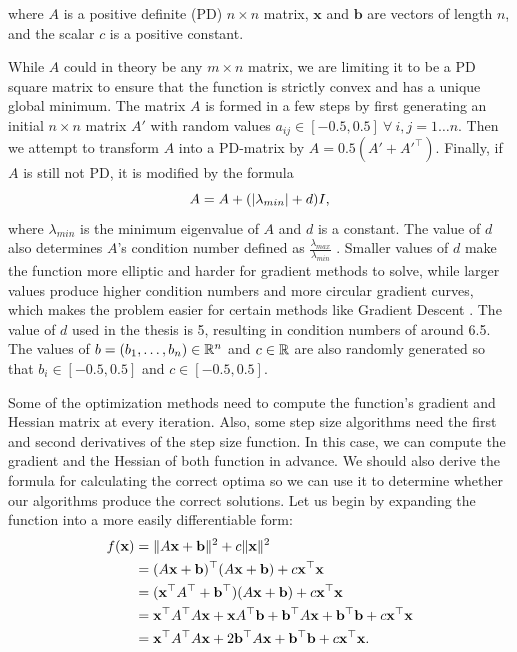 \documentclass[a4paper,english,titlepage,12pt]{article}
\newcommand{\vect}[1]{\ensuremath{\mathbf{#1}}}
\newcommand{\trans}[1]{\ensuremath\vect{#1}^\top}
\newcommand{\norm}[1]{\ensuremath\Vert #1 \Vert}
\newcommand{\abs}[1]{\ensuremath|#1|}
\newcommand{\R}{\ensuremath\mathbb{R}}
\begin{document}
where $A$ is a positive definite (PD) $n \times n$ matrix, $\vect{x}$ and $\vect{b}$ are vectors of length $n$, and the scalar $c$ is a positive constant.

While $A$ could in theory be any $m \times n$ matrix, we are limiting it to be a PD square matrix to ensure that the function is strictly convex and has a unique global minimum. The matrix $A$ is formed in a few steps by first generating an initial $n \times n$ matrix $A'$ with random values $a_{ij} \in [-0.5, 0.5]\ \forall\ i,j = 1 \dots n$. Then we attempt to transform $A$ into a PD-matrix by $A = 0.5 (A' + A'^\top)$. Finally, if  $A$ is still not PD, it is modified by the formula 
\begin{equation}
    A = A + (\abs{\lambda_{min}} + d) I,
\end{equation}
where $\lambda_{min}$ is the minimum eigenvalue of $A$ and $d$ is a constant. The value of $d$ also determines $A$'s condition number defined as $\frac{\lambda_{max}}{\lambda_{min}}$ \cite{book:numberical_linear_algebra}. Smaller values of $d$ make the function more elliptic and harder for gradient methods to solve, while larger values produce higher condition numbers and more circular gradient curves, which makes the problem easier for certain methods like Gradient Descent \cite{book:introduction_continuous_optimization}. The value of $d$ used in the thesis is 5, resulting in condition numbers of around 6.5.
The values of $b = (b_1,\dots,b_n) \in \R^n$ and $c\in \R$ are also randomly generated so that $b_i \in [-0.5, 0.5]$ and $c \in [-0.5, 0.5]$.

Some of the optimization methods need to compute the function's gradient and Hessian matrix at every iteration. Also, some step size algorithms need the first and second derivatives of the step size function. In this case, we can compute the gradient and the Hessian of both function in advance. 
We should also derive the formula for calculating the correct optima so we can use it to determine whether our algorithms produce the correct solutions. Let us begin by expanding the function into a more easily differentiable form:
\begin{align*}
    f(\vect{x}) &= \norm{A \vect{x} + \vect{b}} ^ 2 + c \norm{\vect{x}} ^ 2 \\
               &= (A \vect{x} + \vect{b})^\top(A \vect{x} + \vect{b}) + c \trans{x} \vect{x} \\
               &= (\trans{x} A^\top + \trans{b})(A\vect{x} + \vect{b}) + c \trans{x} \vect{x} \\
               &= \trans{x} A^\top A \vect{x} + \vect{x} A^\top \vect{b} + \trans{b} A \vect{x} + \trans{b} \vect{b} + c \trans{x} \vect{x} \\
               &= \trans{x} A^\top A \vect{x} + 2 \trans{b} A \vect{x} + \trans{b} \vect{b} + c \trans{x} \vect{x}.
\end{align*}
\end{document}
